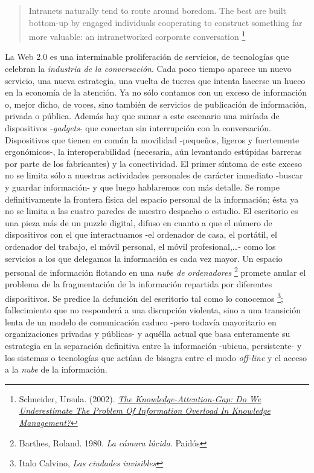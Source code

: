 \documentclass[12pt, a4paper,twoside]{book}
\begin{document}
\begin{quote}
Intranets naturally tend to route around boredom. The best are
built bottom-up by engaged individuals cooperating to construct
something far more valuable: an intranetworked corporate
conversation%
\footnote{Schneider, Ursula. (2002).
\emph{\href{http://www.jucs.org/jucs_8_5/the_knowledge_attention_gap/Schneider_U.html}{The Knowledge-Attention-Gap: Do We Underestimate The Problem Of Information Overload In Knowledge Management?}}}

\end{quote}
La Web 2.0 es una interminable proliferación de servicios, de
tecnologías que celebran la \emph{industria de la conversación}.
Cada poco tiempo aparece un nuevo servicio, una nueva estrategia,
una vuelta de tuerca que intenta hacerse un hueco en la economía de
la atención. Ya no sólo contamos con un exceso de información o,
mejor dicho, de voces, sino también de servicios de publicación de
información, privada o pública. Además hay que sumar a este
escenario una miríada de dispositivos -\emph{gadgets}- que conectan
sin interrupción con la conversación. Dispositivos que tienen en
común la movilidad -pequeños, ligeros y fuertemente ergonómicos-,
la interoperabilidad (necesaria, aún levantando estúpidas barreras
por parte de los fabricantes) y la conectividad. El primer síntoma
de este exceso no se limita sólo a nuestras actividades personales
de carácter inmediato -buscar y guardar información- y que luego
hablaremos con más detalle. Se rompe definitivamente la frontera
física del espacio personal de la información; ésta ya no se limita
a las cuatro paredes de nuestro despacho o estudio. El escritorio
es una pieza más de un puzzle digital, difuso en cuanto a que el
número de dispositivos con el que interactuamos -el ordenador de
casa, el portátil, el ordenador del trabajo, el móvil personal, el
móvil profesional,\ldots{}- como los servicios a los que delegamos
la información es cada vez mayor. Un espacio personal de
información flotando en una \emph{nube de ordenadores}%
\footnote{Barthes, Roland. 1980. \emph{La cámara lúcida}. Paidós}
promete anular el problema de la fragmentación de la información
repartida por diferentes dispositivos. Se predice la defunción del
escritorio tal como lo conocemos%
\footnote{Italo Calvino, \emph{Las ciudades invisibles}};
fallecimiento que no responderá a una disrupción violenta, sino a
una transición lenta de un modelo de comunicación caduco -pero
todavía mayoritario en organizaciones privadas y públicas- y
aquélla actual que basa enteramente su estrategia en la separación
definitiva entre la información -ubicua, persistente- y los
sistemas o tecnologías que actúan de bisagra entre el modo
\emph{off-line} y el acceso a la \emph{nube} de la información.
\end{document}
